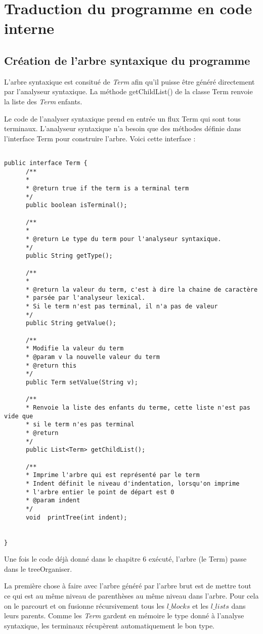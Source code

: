 \chapter{Traduction du programme en code interne}
\section{Création de l'arbre syntaxique du programme}
L'arbre syntaxique est consitué de \emph{Term} afin
qu'il puisse être généré directement par l'analyseur syntaxique. 
La méthode getChildList() de la classe Term renvoie la liste des \emph{Term} enfants.


Le code de l'analyser syntaxique prend en entrée un flux Term qui sont tous terminaux. 
L'analyseur syntaxique n'a besoin que des méthodes définie dans l'interface Term pour construire l'arbre.
Voici cette interface : 

\begin{verbatim}

public interface Term {
	  /**
	  * 
	  * @return true if the term is a terminal term
	  */
	  public boolean isTerminal();
	  
	  /**
	  * 
	  * @return Le type du term pour l'analyseur syntaxique.
	  */
	  public String getType();
	
	  /**
	  * 
	  * @return la valeur du term, c'est à dire la chaine de caractère
	  * parsée par l'analyseur lexical.
	  * Si le term n'est pas terminal, il n'a pas de valeur
	  */
	  public String getValue();
	
	  /**
	  * Modifie la valeur du term
	  * @param v la nouvelle valeur du term
	  * @return this
	  */
	  public Term setValue(String v);
	
	  /**
	  * Renvoie la liste des enfants du terme, cette liste n'est pas vide que
	  * si le term n'es pas terminal
	  * @return
	  */
	  public List<Term> getChildList();
	
	  /**
	  * Imprime l'arbre qui est représenté par le term
	  * Indent définit le niveau d'indentation, lorsqu'on imprime
	  * l'arbre entier le point de départ est 0
	  * @param indent
	  */
	  void	printTree(int indent);
	
	
}
\end{verbatim}


Une fois le code déjà donné dans le chapitre 6 exécuté, l'arbre (le Term) passe dans le treeOrganiser.

La première chose à faire avec l'arbre généré par l'arbre brut est
de mettre tout ce qui est au même niveau de parenthèses au même niveau
dans l'arbre. Pour cela on le parcourt et on fusionne récursivement tous
les $l\_blocks$ et les $l\_lists$ dans leurs parents. Comme les \emph{Term}
gardent en mémoire le type donné à l'analyse syntaxique, les terminaux
récupèrent automatiquement le bon type. 
 
